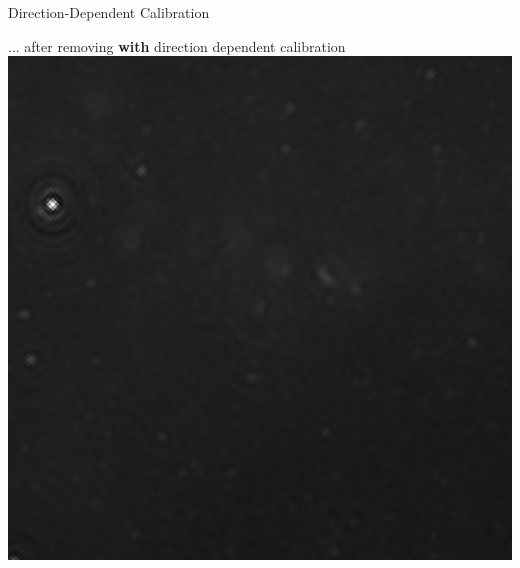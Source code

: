 \documentclass{beamer}
\begin{document}
\begin{frame}{Direction-Dependent Calibration}
\begin{overprint}
\begin{center}
        \end{center}
        \begin{center}
            ... after removing \textbf{with} direction dependent calibration \\
            \vskip 10pt
            \includegraphics[height=0.6\textheight]{figures/cas-a-peeling}
        \end{center}
    \end{overprint}
\end{frame}
\end{document}

